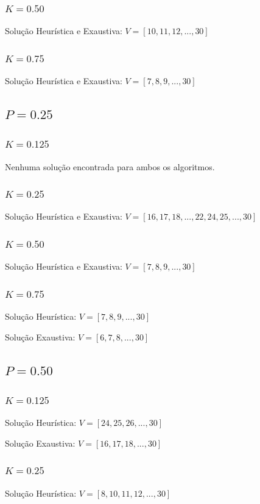\documentclass{revdetua}
\begin{document}
\subsubsection{$K = 0.50$}
Solução Heurística e Exaustiva: $V = [10,11,12,...,30]$

\subsubsection{$K = 0.75$}
Solução Heurística e Exaustiva: $V = [7,8,9,...,30]$

\subsection{$P = 0.25$}

\subsubsection{$K = 0.125$}
Nenhuma solução encontrada para ambos os algoritmos.

\subsubsection{$K = 0.25$}
Solução Heurística e Exaustiva: $V = [16,17,18,...,22,24,25,...,30]$
\subsubsection{$K = 0.50$}
Solução Heurística e Exaustiva: $V = [7,8,9,...,30]$

\subsubsection{$K = 0.75$}
Solução Heurística: $V = [7,8,9,...,30]$

Solução Exaustiva: $V = [6,7,8,...,30]$

\subsection{$P = 0.50$}

\subsubsection{$K = 0.125$}
Solução Heurística: $V = [24,25,26,...,30]$

Solução Exaustiva: $V = [16,17,18,...,30]$

\subsubsection{$K = 0.25$}
Solução Heurística: $V = [8,10,11,12,...,30]$
\end{document}
